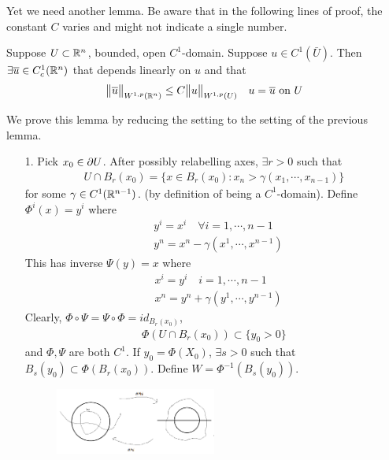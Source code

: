 \documentclass[10pt,a4paper]{report}
\newenvironment{proof}
{\begin{changemargin}{1cm}{0.5cm} 
	}%
	{\end{changemargin}
}
\begin{document}
Yet we need another lemma. Be aware that in the following lines of proof, the constant $C$ varies and might not indicate a single number.
\s

\lem Suppose $U\subset \mathbb{R}^n$, bounded, open $C^1$-domain. Suppose $u\in C^1 (\bar{U})$. Then $\exists \overline{u} \in C^1_c(\mathbb{R}^n)$ that depends linearly on $u$ and that
\begin{align*}
\bigl\lVert\overline{u}\bigr\rVert_{W^{1,p}(\mathbb{R}^n)} \leq C \bigl\lVert u\bigr\rVert_{W^{1,p}(U)} \quad u= \overline{u} \text{ on } U
\end{align*}
\begin{proof} 
\pf We prove this lemma by reducing the setting to the setting of the previous lemma.
\begin{itemize}
\item[1.] Pick $x_0 \in \partial U$. After possibly relabelling axes, $\exists r>0$ such that
\begin{align*}
U \cap B_r(x_0) = \{x\in B_r(x_0) : x_n > \gamma(x_1, \cdots, x_{n-1}) \}
\end{align*}
for some $\gamma \in C^1(\mathbb{R}^{n-1})$. (by definition of being a $C^1$-domain). Define $\Phi^i (x) = y^i$ where
\begin{align*}
& y^i  = x^i \quad \forall i=1, \cdots, n-1 \\
& y^n = x^n - \gamma(x^1, \cdots, x^{n-1})
\end{align*}
This has inverse $\Psi(y) = x$ where
\begin{align*}
& x^i = y^i \quad i=1,\cdots, n-1 \\
& x^n = y^n + \gamma(y^1, \cdots, y^{n-1})
\end{align*}
Clearly, $\Phi \circ \Psi = \Psi \circ \Phi = id_{B_r(x_0)}$,	
\begin{align*}
\Phi(U \cap B_r(x_0)) \subset \{y_0 >0 \}
\end{align*}
and $\Phi, \Psi$ are both $C^1$. If $y_0 = \Phi(X_0)$, $\exists s>0$ such that $B_s(y_0) \subset \Phi(B_r(x_0))$. Define $W = \Phi^{-1}(B_s(y_0))$.

\begin{figure}[h]
	\centering
	\includegraphics[width=0.5\textwidth]{5}
\end{figure}


\end{itemize}
\end{proof}
\end{document}
